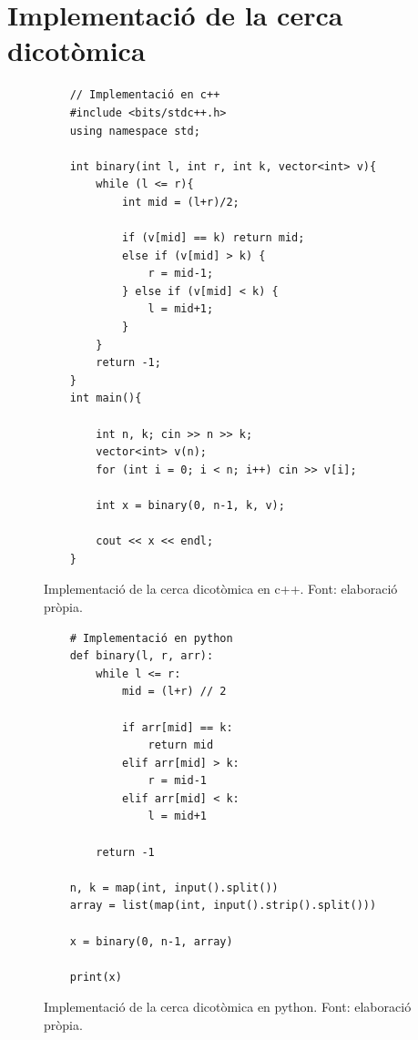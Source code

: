 \section{Implementació de la cerca dicotòmica}
\begin{figure}[H]
    \begin{verbatim}
    // Implementació en c++
    #include <bits/stdc++.h>
    using namespace std;
    
    int binary(int l, int r, int k, vector<int> v){
        while (l <= r){
            int mid = (l+r)/2;
    
            if (v[mid] == k) return mid;
            else if (v[mid] > k) {
                r = mid-1;
            } else if (v[mid] < k) {
                l = mid+1;
            }
        }
        return -1;
    }
    int main(){
    
        int n, k; cin >> n >> k;
        vector<int> v(n);
        for (int i = 0; i < n; i++) cin >> v[i];
    
        int x = binary(0, n-1, k, v);
    
        cout << x << endl;
    }
    \end{verbatim}
    \caption[Implementació de la cerca dicotòmica en c++.]{Implementació de la cerca dicotòmica en c++. Font: elaboració pròpia.}
    \label{Figura}
\end{figure}
\begin{figure}[H]
    \begin{verbatim}
    # Implementació en python
    def binary(l, r, arr):
        while l <= r:
            mid = (l+r) // 2
    
            if arr[mid] == k:
                return mid
            elif arr[mid] > k:
                r = mid-1
            elif arr[mid] < k:
                l = mid+1
    
        return -1
        
    n, k = map(int, input().split())
    array = list(map(int, input().strip().split()))
    
    x = binary(0, n-1, array)
    
    print(x)
    \end{verbatim}
    \caption[Implementació de la cerca dicotòmica en python.]{Implementació de la cerca dicotòmica en python. Font: elaboració pròpia.}
    \label{Figura}
\end{figure}

